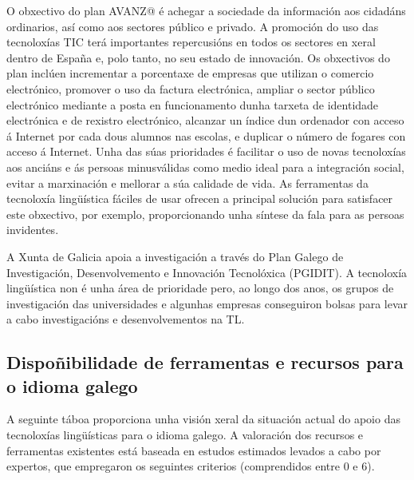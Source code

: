 \begin{multicols}{2}
O obxectivo do plan AVANZ@ é achegar a sociedade da información aos cidadáns ordinarios, así como aos sectores público e privado. A promoción do uso das tecnoloxías TIC terá importantes repercusións en todos os sectores en xeral dentro de España e, polo tanto, no seu estado de innovación. Os obxectivos do plan inclúen incrementar a porcentaxe de empresas que utilizan o comercio electrónico, promover o uso da factura electrónica, ampliar o sector público electrónico mediante a posta en funcionamento dunha tarxeta de identidade electrónica e de rexistro electrónico, alcanzar un índice dun ordenador con acceso á Internet por cada dous alumnos nas escolas, e duplicar o número de fogares con acceso á Internet. Unha das súas prioridades é facilitar o uso de novas tecnoloxías aos anciáns e ás persoas minusválidas como medio ideal para a integración social, evitar a marxinación e mellorar a súa calidade de vida. As ferramentas da tecnoloxía lingüística fáciles de usar ofrecen a principal solución para satisfacer este obxectivo, por exemplo, proporcionando unha síntese da fala para as persoas invidentes.

A Xunta de Galicia apoia a investigación a través do Plan Galego de Investigación, Desenvolvemento e Innovación Tecnolóxica (PGIDIT). A tecnoloxía lingüística non é unha área de prioridade pero, ao longo dos 
anos, os grupos de investigación das universidades e algunhas empresas conseguiron bolsas para levar a cabo investigacións e desenvolvementos na TL.

\subsection{Dispoñibilidade de ferramentas e recursos para o idioma galego}

   A seguinte táboa proporciona unha visión xeral da situación actual do apoio das tecnoloxías lingüísticas para o idioma galego. A valoración dos recursos e ferramentas existentes está baseada en estudos estimados levados a cabo por expertos, que empregaron os seguintes criterios (comprendidos entre 0 e 6). 
 

\end{multicols}

